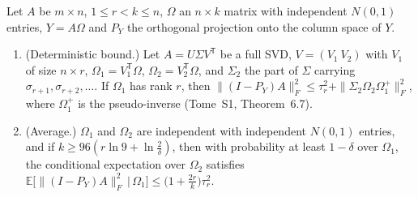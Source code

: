 \begin{theorem}\label{thm:rangefinder}
Let $A$ be $m\times n$, $1\le r<k\le n$, $\Omega$ an $n\times k$ matrix with independent $N(0,1)$ entries, $Y=A\Omega$ and $P_Y$ the orthogonal projection onto the column space of $Y$.
\begin{enumerate}
\item (Deterministic bound.) Let $A=U\Sigma V^{\mathsf T}$ be a full SVD, $V=(V_1\ V_2)$ with $V_1$ of size $n\times r$, $\Omega_1=V_1^{\mathsf T}\Omega$, $\Omega_2=V_2^{\mathsf T}\Omega$, and $\Sigma_2$
the part of $\Sigma$ carrying $\sigma_{r+1},\sigma_{r+2},\dots$. If $\Omega_1$ has rank $r$, then $\|(I-P_Y)A\|_F^2\le\tau_r^2+\|\Sigma_2\Omega_2\Omega_1^+\|_F^2$, where $\Omega_1^+$ is the
pseudo-inverse (Tome~S1, Theorem~6.7).
\item (Average.) $\Omega_1$ and $\Omega_2$ are independent with independent $N(0,1)$ entries, and if $k\ge96(r\ln9+\ln\frac2\delta)$, then with probability at least $1-\delta$ over
$\Omega_1$, the conditional expectation over $\Omega_2$ satisfies $\mathbb E\bigl[\|(I-P_Y)A\|_F^2\,\big|\,\Omega_1\bigr]\le\bigl(1+\frac{2r}k\bigr)\tau_r^2$.
\end{enumerate}
\end{theorem}
